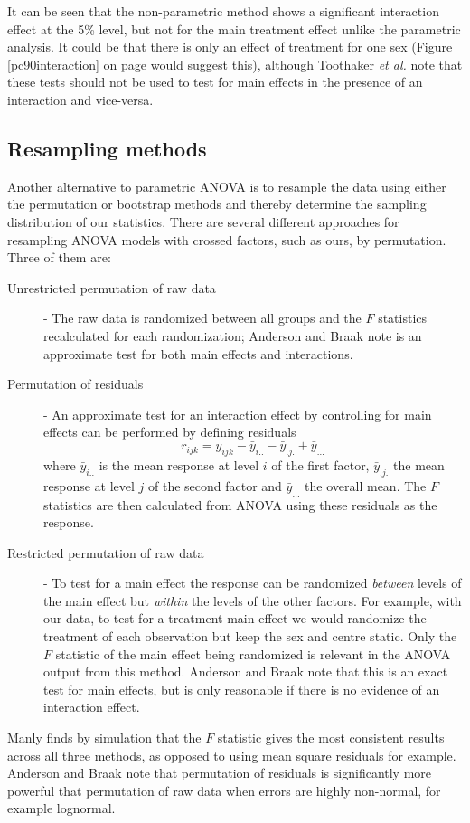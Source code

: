 It can be seen that the non-parametric method shows a significant interaction effect at the 5\% level, but not for the main treatment effect unlike the parametric analysis. It could be that there is only an effect of treatment for one sex (Figure \ref{pc90interaction} on page \pageref{pc90interaction} would suggest this), although Toothaker \textit{et al.}\cite{toothaker} note that these tests should not be used to test for main effects in the presence of an interaction and vice-versa.

\subsection{Resampling methods}\label{section:resampling}
Another alternative to parametric ANOVA is to resample the data using either the permutation or bootstrap methods\cite{manly} and thereby determine the sampling distribution of our statistics. There are several different approaches for resampling ANOVA models with crossed factors, such as ours, by permutation\cite{manly, anderson}. Three of them are:
\begin{description}
\item[Unrestricted permutation of raw data] - The raw data is randomized between all groups and the $F$ statistics recalculated for each randomization; Anderson and Braak\cite{anderson} note is an approximate test for both main effects and interactions.
\item[Permutation of residuals] - An approximate test for an interaction effect by controlling for main effects can be performed by defining residuals
$$r_{ijk}=y_{ijk}-\bar{y}_{i..}-\bar{y}_{.j.}+\bar{y}_{...}$$
where $\bar{y}_{i..}$ is the mean response at level $i$ of the first factor, $\bar{y}_{.j.}$ the mean response at level $j$ of the second factor and $\bar{y}_{...}$ the overall mean. The $F$ statistics are then calculated from ANOVA using these residuals as the response.
\item[Restricted permutation of raw data] - To test for a main effect the response can be randomized \emph{between} levels of the main effect but \emph{within} the levels of the other factors. For example, with our data, to test for a treatment main effect we would randomize the treatment of each observation but keep the sex and centre static. Only the $F$ statistic of the main effect being randomized is relevant in the ANOVA output from this method. Anderson and Braak\cite{anderson} note that this is an exact test for main effects, but is only reasonable if there is no evidence of an interaction effect.
\end{description}
Manly\cite{manly} finds by simulation that the $F$ statistic gives the most consistent results across all three methods, as opposed to using mean square residuals for example. Anderson and Braak\cite{anderson} note that permutation of residuals is significantly more powerful that permutation of raw data when errors are highly non-normal, for example lognormal.


